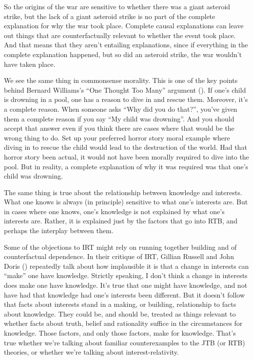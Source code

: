 \documentclass[
  12pt,
  letterpaper,
]{scrbook}
\begin{document}
So the origins of the war are sensitive to whether there was a giant
asteroid strike, but the lack of a giant asteroid strike is no part of
the complete explanation for why the war took place. Complete causal
explanations can leave out things that are counterfactually relevant to
whether the event took place. And that means that they aren't entailing
explanations, since if everything in the complete explanation happened,
but so did an asteroid strike, the war wouldn't have taken place.

We see the same thing in commonsense morality. This is one of the key
points behind Bernard Williams's ``One Thought Too Many'' argument
(). If one's child is
drowning in a pool, one has a reason to dive in and rescue them.
Moreover, it's a complete reason. When someone asks ``Why did you do
that?'', you've given them a complete reason if you say ``My child was
drowning''. And you should accept that answer even if you think there
are cases where that would be the wrong thing to do. Set up your
preferred horror story moral example where diving in to rescue the child
would lead to the destruction of the world. Had that horror story been
actual, it would not have been morally required to dive into the pool.
But in reality, a complete explanation of why it was required was that
one's child was drowning.

The same thing is true about the relationship between knowledge and
interests. What one knows is always (in principle) sensitive to what
one's interests are. But in cases where one knows, one's knowledge is
not explained by what one's interests are. Rather, it is explained just
by the factors that go into RTB, and perhaps the interplay between them.

Some of the objections to IRT might rely on running together building
and of counterfactual dependence. In their critique of IRT, Gillian
Russell and John Doris ()
repeatedly talk about how implausible it is that a change in interests
can ``make'' one have knowledge. Strictly speaking, I don't think a
change in interests does make one have knowledge. It's true that one
might have knowledge, and not have had that knowledge had one's
interests been different. But it doesn't follow that facts about
interests stand in a making, or building, relationship to facts about
knowledge. They could be, and should be, treated as things relevant to
whether facts about truth, belief and rationality suffice in the
circumstances for knowledge. Those factors, and only those factors, make
for knowledge. That's true whether we're talking about familiar
counterexamples to the JTB (or RTB) theories, or whether we're talking
about interest-relativity.
\end{document}
